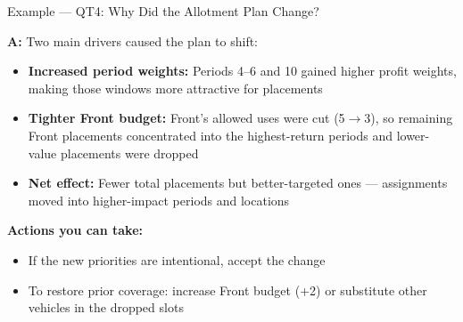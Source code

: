 \documentclass[aspectratio=169,10pt]{beamer}
\begin{document}
\begin{frame}[t]{Example — QT4: Why Did the Allotment Plan Change?}
\vspace{2pt}
\vspace{4pt}
\small\textbf{\textcolor{lgrn}{A:}}\;
Two main drivers caused the plan to shift:
\vspace{2pt}
\footnotesize
\begin{itemize}\setlength\itemsep{3pt}
  \item \textbf{Increased period weights:} Periods 4--6 and 10 gained higher profit
        weights, making those windows more attractive for placements
  \item \textbf{Tighter Front budget:} Front's allowed uses were cut (5$\to$3),
        so remaining Front placements concentrated into the highest-return periods
        and lower-value placements were dropped
  \item \textbf{Net effect:} Fewer total placements but better-targeted ones ---
        assignments moved into higher-impact periods and locations
\end{itemize}
\vspace{6pt}
\small\textbf{Actions you can take:}
\footnotesize
\begin{itemize}\setlength\itemsep{3pt}
  \item If the new priorities are intentional, accept the change
  \item To restore prior coverage: increase Front budget (+2) or
        substitute other vehicles in the dropped slots
\end{itemize}
\end{frame}
\end{document}
